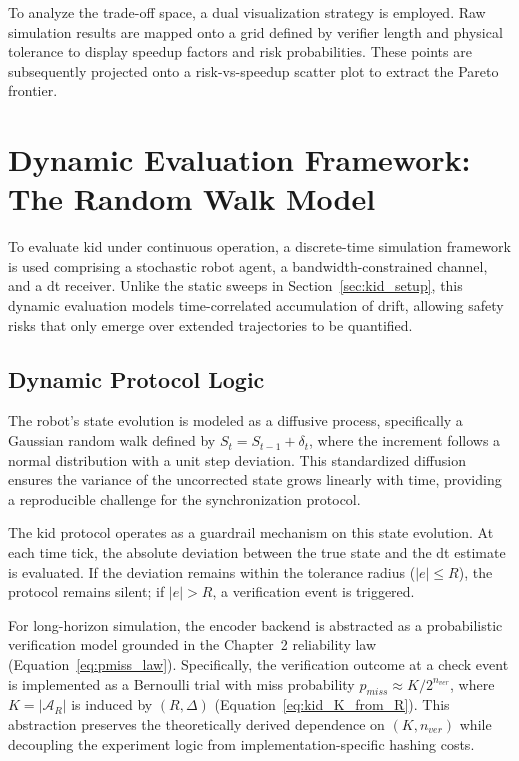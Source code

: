 To analyze the trade-off space, a dual visualization strategy is employed. Raw simulation results are mapped onto a grid defined by verifier length and physical tolerance to display speedup factors and risk probabilities. These points are subsequently projected onto a risk-vs-speedup scatter plot to extract the Pareto frontier.

\section{Dynamic Evaluation Framework: The Random Walk Model}
\label{sec:dynamic_evaluation}

To evaluate \gls{kid} under continuous operation, a discrete-time simulation framework is used comprising a stochastic robot agent, a bandwidth-constrained channel, and a \gls{dt} receiver. Unlike the static sweeps in Section~\ref{sec:kid_setup}, this dynamic evaluation models time-correlated accumulation of drift, allowing safety risks that only emerge over extended trajectories to be quantified.

\subsection{Dynamic Protocol Logic}
The robot's state evolution is modeled as a diffusive process, specifically a Gaussian random walk defined by $S_t = S_{t-1} + \delta_t$, where the increment follows a normal distribution with a unit step deviation. This standardized diffusion ensures the variance of the uncorrected state grows linearly with time, providing a reproducible challenge for the synchronization protocol.

The \gls{kid} protocol operates as a guardrail mechanism on this state evolution. At each time tick, the absolute deviation between the true state and the \gls{dt} estimate is evaluated. If the deviation remains within the tolerance radius ($|e|\le R$), the protocol remains silent; if $|e|>R$, a verification event is triggered.

For long-horizon simulation, the encoder backend is abstracted as a probabilistic verification model grounded in the Chapter~2 reliability law (Equation~\eqref{eq:pmiss_law}). Specifically, the verification outcome at a check event is implemented as a Bernoulli trial with miss probability $p_{miss}\approx K/2^{n_{ver}}$, where $K=|\mathcal{A}_R|$ is induced by $(R,\Delta)$ (Equation~\eqref{eq:kid_K_from_R}). This abstraction preserves the theoretically derived dependence on $(K,n_{ver})$ while decoupling the experiment logic from implementation-specific hashing costs.

